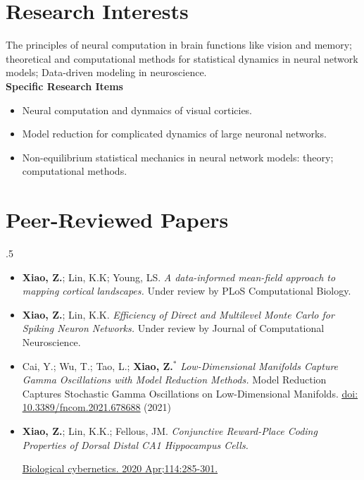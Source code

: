 \documentclass[margin, 11pt]{res} %
\begin{document}
\begin{resume}
\section{Research Interests}
\label{Research}
The principles of neural computation in brain functions like vision and memory; theoretical and computational methods for statistical dynamics in neural network models; Data-driven modeling in neuroscience.\\
{\bf Specific Research Items}
\begin{itemize}
    \item Neural computation and dynmaics of visual corticies.
    \item Model reduction for complicated dynamics of large neuronal networks.
    \item Non-equilibrium statistical mechanics in neural network models: theory; computational methods.
\end{itemize}

\section{Peer-Reviewed Papers}
\label{Publications1}
\moveleft.5\hoffset\centerline{  } %
\begin{itemize}
\item \textbf{Xiao, Z.}; Lin, K.K; Young, LS. \textit{A data-informed mean-field approach to mapping cortical landscapes.} Under review by PLoS Computational Biology. 

\item \textbf{Xiao, Z.}; Lin, K.K. \textit{Efficiency of Direct and Multilevel Monte Carlo for Spiking Neuron Networks. } Under review by Journal of Computational Neuroscience. 

\item Cai, Y.; Wu, T.; Tao, L.; \textbf{Xiao, Z.$^*$} \textit{Low-Dimensional Manifolds Capture Gamma Oscillations with Model Reduction Methods.} Model Reduction Captures Stochastic Gamma Oscillations on Low-Dimensional Manifolds. \href{Front. Comput. Neurosci. 15:678688.}{\underline{doi: 10.3389/fncom.2021.678688}} (2021)

\item  \textbf{Xiao, Z.}; Lin, K.K.; Fellous, JM. \textit{Conjunctive Reward-Place Coding Properties of Dorsal Distal CA1 Hippocampus Cells.}

\href{https://link.springer.com/article/10.1007/s00422-020-00830-0}{\underline{Biological cybernetics. 2020 Apr;114:285-301.}}



\end{itemize}
\end{resume}
\end{document}
